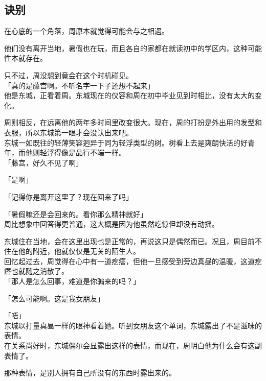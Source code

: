 \subsection{诀别}

在心底的一个角落，周原本就觉得可能会与之相遇。

他们没有离开当地，暑假也在玩，而且各自的家都在就读初中的学区内，这种可能性本就存在。

只不过，周没想到竟会在这个时机碰见。\\

「真的是藤宫啊。不听名字一下子还想不起来」\\

他是东城，正看着周。东城现在的仪容和周在初中毕业见到时相比，没有太大的变化。

周则相反，在远离他的两年多时间里改变很大。现在，周的打扮是外出用的发型和衣服，所以东城第一眼才会没认出来吧。\\

东城一如既往的轻薄笑容迥异于同为轻浮类型的树。树看上去是爽朗快活的好青年，而他则轻浮得像是品行不端一样。\\

「藤宫，好久不见了啊」

「是啊」

「记得你是离开这里了？现在回来了吗」

「暑假嘛还是会回来的。看你那么精神就好」\\

周比想象中回答得更普通，这大概是因为他虽然吃惊但却没有动摇。

东城住在当地，会在这里出现也是正常的，再说这只是偶然而已。况且，周目前不住在他的附近，他就仅仅是无关的陌生人。\\

回忆起过去，周觉得在心中有一道疙瘩，但他一旦感受到旁边真昼的温暖，这道疙瘩也就随之消散了。\\

「那人是怎么回事，难道是你骗来的吗？」

「怎么可能啊。这是我女朋友」

「唔」\\

东城以打量真昼一样的眼神看着她。听到女朋友这个单词，东城露出了不是滋味的表情。\\

在关系尚好时，东城偶尔会显露出这样的表情，而现在，周明白他为什么会有这副表情了。

那种表情，是别人拥有自己所没有的东西时露出来的。\\

